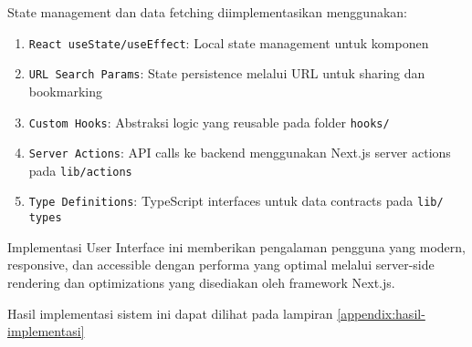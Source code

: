 State management dan data fetching diimplementasikan menggunakan:

\begin{enumerate}
	\item \texttt{React useState/useEffect}: Local state management untuk komponen
	\item \texttt{URL Search Params}: State persistence melalui URL untuk sharing dan bookmarking
	\item \texttt{Custom Hooks}: Abstraksi logic yang reusable pada folder \texttt{hooks/}
	\item \texttt{Server Actions}: API calls ke backend menggunakan Next.js server actions pada \texttt{lib/actions}
	\item \texttt{Type Definitions}: TypeScript interfaces untuk data contracts pada \texttt{lib/\\types}
\end{enumerate}

Implementasi User Interface ini memberikan pengalaman pengguna yang modern, responsive, dan accessible dengan performa yang optimal melalui server-side rendering dan optimizations yang disediakan oleh framework Next.js.

Hasil implementasi sistem ini dapat dilihat pada lampiran \ref{appendix:hasil-implementasi}